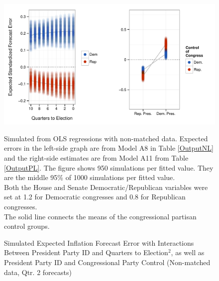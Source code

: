 \documentclass[a4paper]{article}\usepackage{graphicx, color}
\newenvironment{knitrout}{}{} %
\begin{document}
\begin{figure}[t]
    \caption{Simulated Expected Inflation Forecast Error with Interactions Between President Party ID and Quarters to Election$^{2}$, as well as President Party ID and Congressional Party Control (Non-matched data, Qtr. 2 forecasts)}
    \label{InterPlot}
    \begin{center}

\begin{knitrout}
\color{fgcolor}\includegraphics[width=0.95\linewidth]{figure/InterPlot} 
\end{knitrout}


    \end{center}
    \begin{singlespace}
        {\scriptsize{Simulated from OLS regressions with non-matched data. Expected errors in the left-side graph are from Model A8 in Table \ref{OutputNL} and the right-side estimates are from Model A11 from Table \ref{OutputPL}. The figure shows 950 simulations per fitted value. They are the middle 95\% of 1000 simulations per fitted value. \\ Both the House and Senate Democratic/Republican variables were set at 1.2 for Democratic congresses and 0.8 for Republican congresses. \\ The solid line connects the means of the congressional partisan control groups.}}
    \end{singlespace}
\end{figure}
\end{document}
